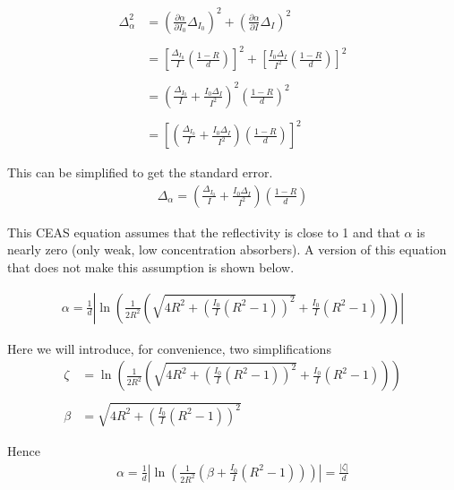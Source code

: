     \begin{align*}
      \Delta_\alpha^2 &= \left(\frac{\partial \alpha}{\partial I_0}\Delta_{I_0}\right)^2  + \left(\frac{\partial \alpha}{\partial I}\Delta_I\right)^2  \\\\
                      &= \left[\frac{\Delta_{I_0}}{I}\left(\frac{1-R}{d}\right)\right]^2 + \left[\frac{I_0 \Delta_I }{I^2}\left(\frac{1-R}{d}\right)\right]^2 \\\\
                      &= \left(\frac{\Delta_{I_0}}{I} + \frac{I_0\Delta_I}{I^2}\right)^2 \left(\frac{1-R}{d}\right)^2 \\\\
               &= \left[\left(\frac{\Delta_{I_0}}{I} + \frac{I_0\Delta_I}{I^2}\right) \left(\frac{1-R}{d}\right)\right]^2
    \end{align*}

    This can be simplified to get the standard error.
    \begin{align}
      \Delta_\alpha = \left(\frac{\Delta_{I_0}}{I} + \frac{I_0\Delta_I}{I^2}\right) \left(\frac{1-R}{d}\right)\label{eq:err}
    \end{align}

    This CEAS equation assumes that the reflectivity is close to 1 and that $\alpha$ is nearly zero (only weak, low concentration absorbers). A version of this equation that does not make this assumption is shown below.

    \begin{align}
      \alpha = \frac{1}{d}\left|\ln\left(\frac{1}{2R^2}\left(\sqrt{4R^2+\left(\frac{I_0}{I}(R^2-1)\right)^2} + \frac{I_0}{I}(R^2-1)\right)\right)\right| \label{eq:ceas_full}
    \end{align}

    Here we will introduce, for convenience, two simplifications
    \begin{align*}
      \zeta &= \ln\left(\frac{1}{2R^2}\left(\sqrt{4R^2+\left(\frac{I_0}{I}(R^2-1)\right)^2} + \frac{I_0}{I}(R^2-1)\right)\right)\\\\
      \beta &= \sqrt{4R^2+\left(\frac{I_0}{I}(R^2-1)\right)^2}
    \end{align*}

    Hence
    \begin{align*}
      \alpha = \frac{1}{d}\left|\ln\left(\frac{1}{2R^2}\left(\beta+\frac{I_0}{I}(R^2-1)\right)\right)\right| = \frac{\left|\zeta\right|}{d}
    \end{align*}


